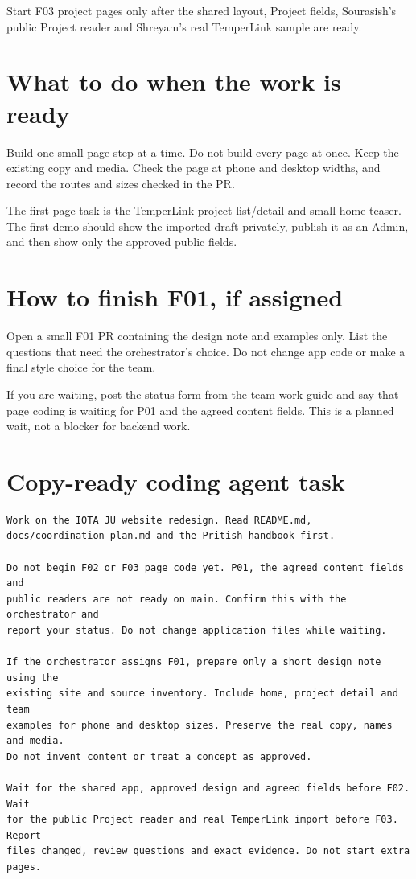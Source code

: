\documentclass[11pt]{article}
\begin{document}
Start F03 project pages only after the shared layout, Project fields, Sourasish's public Project reader and Shreyam's real TemperLink sample are ready.

\section{What to do when the work is ready}

Build one small page step at a time. Do not build every page at once. Keep the existing copy and media. Check the page at phone and desktop widths, and record the routes and sizes checked in the PR.

The first page task is the TemperLink project list/detail and small home teaser. The first demo should show the imported draft privately, publish it as an Admin, and then show only the approved public fields.

\section{How to finish F01, if assigned}

Open a small F01 PR containing the design note and examples only. List the questions that need the orchestrator's choice. Do not change app code or make a final style choice for the team.

If you are waiting, post the status form from the team work guide and say that page coding is waiting for P01 and the agreed content fields. This is a planned wait, not a blocker for backend work.

\section{Copy-ready coding agent task}

\begin{verbatim}
Work on the IOTA JU website redesign. Read README.md,
docs/coordination-plan.md and the Pritish handbook first.

Do not begin F02 or F03 page code yet. P01, the agreed content fields and
public readers are not ready on main. Confirm this with the orchestrator and
report your status. Do not change application files while waiting.

If the orchestrator assigns F01, prepare only a short design note using the
existing site and source inventory. Include home, project detail and team
examples for phone and desktop sizes. Preserve the real copy, names and media.
Do not invent content or treat a concept as approved.

Wait for the shared app, approved design and agreed fields before F02. Wait
for the public Project reader and real TemperLink import before F03. Report
files changed, review questions and exact evidence. Do not start extra pages.
\end{verbatim}
\end{document}
